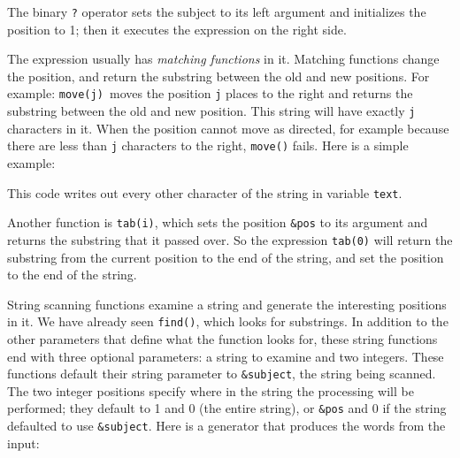 The binary \texttt{?} operator sets the subject to its left argument and
initializes the position to 1; then it executes the expression on the
right side.

The expression usually has \textit{matching
functions} in it. Matching functions change the position, and return
the substring between the old and new positions. For example:
\texttt{move(j)}\texttt{ }moves the position \texttt{j} places to the
right and returns the substring between the old and new position. This
string will have exactly \texttt{j} characters in it. When the position
cannot move as directed, for example because there are less than
\texttt{j} characters to the right, \texttt{move()}
fails. Here is a simple example:


This code writes out every other character of the string in variable
\texttt{text}.

Another function is \texttt{tab(i)}, which sets the
position \texttt{\&pos} to its argument and returns the substring that
it passed over. So the expression \texttt{tab(0)} will return the
substring from the current position to the end of the string, and set
the position to the end of the string.

String scanning functions examine a string and generate the interesting
positions in it. We have already seen \texttt{find()},
which looks for substrings. In addition to the other parameters that
define what the function looks for, these string functions end with
three optional parameters: a string to examine and two integers. These
functions default their string
parameter to \texttt{\&subject}, the string being scanned. The two
integer positions specify where in the string the processing will be
performed; they default to 1 and 0 (the entire string), or
\texttt{\&pos} and 0 if the string defaulted to use \texttt{\&subject}.
Here is a generator that produces the words from the
input:


